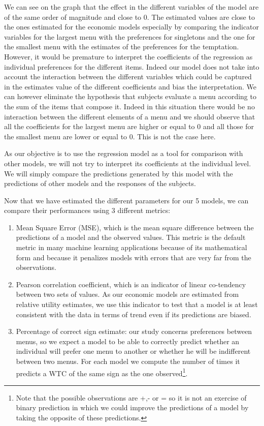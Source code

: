 \documentclass[
]{book}
\providecommand{\tightlist}{%
  \setlength{\itemsep}{0pt}\setlength{\parskip}{0pt}}
\begin{document}
We can see on the graph that the effect in the different variables of the model
are of the same order of magnitude and close to 0.
The estimated values are close to the ones estimated for the economic models
especially by comparing the indicator variables for the largest menu with the
preferences for singletons and the one for the smallest menu with the estimates
of the preferences for the temptation. However, it would be premature to
interpret the coefficients of the regression as individual preferences for the
different items.
Indeed our model does not take into account the interaction between the
different variables which could be captured in the estimates value of the
different coefficients and bias the interpretation.
We can however eliminate the hypothesis that subjects evaluate a menu according
to the sum of the items that compose it.
Indeed in this situation there would be no interaction between the different
elements of a menu and we should observe that all the coefficients for the
largest menu are higher or equal to 0 and all those for the smallest menu are
lower or equal to 0. This is not the case here.

As our objective is to use the regression model as a tool for comparison with
other models, we will not try to interpret its coefficients at the individual
level.
We will simply compare the predictions generated by this model with the
predictions of other models and the responses of the subjects.

Now that we have estimated the different parameters for our 5 models, we can
compare their performances using 3 different metrics:

\begin{enumerate}
\def\labelenumi{\arabic{enumi}.}
\tightlist
\item
  Mean Square Error (MSE), which is the mean square difference between the
  predictions of a model and the observed values.
  This metric is the default metric in many machine learning applications because
  of its mathematical form and because it penalizes models with errors that are
  very far from the observations.
\item
  Pearson correlation coefficient, which is an indicator of linear co-tendency
  between two sets of values.
  As our economic models are estimated from relative utility estimates, we use
  this indicator to test that a model is at least consistent with the data in
  terms of trend even if its predictions are biased.
\item
  Percentage of correct sign estimate: our study concerns preferences between
  menus, so we expect a model to be able to correctly predict whether an
  individual will prefer one menu to another or whether he will be indifferent
  between two menus.
  For each model we compute the number of times it predicts a WTC of the same sign
  as the one observed\footnote{Note that the possible observations are +,- or = so it is not an exercise
    of binary prediction in which we could improve the predictions of a model by taking the
    opposite of these predictions.}.
\end{enumerate}
\end{document}
